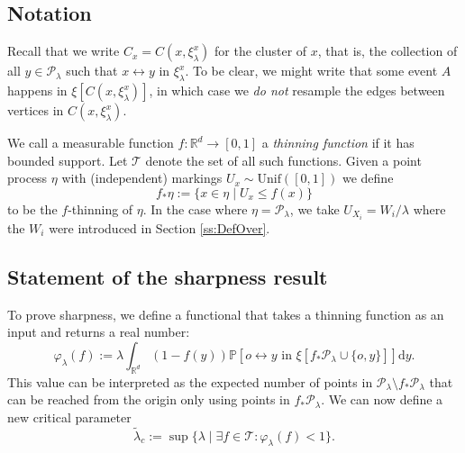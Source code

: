 \documentclass[a4paper,12pt]{scrartcl}
\renewcommand{\P}{\mathbb{P}}
\renewcommand{\d}{\mathrm{d}}
\newcommand{\reals}{\mathbb{R}}
\theoremstyle{definition}
\theoremstyle{remark}
\begin{document}
\subsection{Notation}

Recall that we write $C_x=C(x, \xi_\lambda^x)$ for the cluster of $x$, that is, the collection of all $y\in\mathcal P_\lambda$ such that $x\leftrightarrow y$ in $\xi_\lambda^x$. To be clear, we might write that some event $A$ happens in $\xi[C(x,\xi_\lambda^x)]$, in which case we \emph{do not} resample the edges between vertices in $C(x,\xi_\lambda^x)$.

We call a measurable function $f:\reals^d\to[0,1]$ a \emph{thinning function} if it has bounded support. Let $\mathcal T$ denote the set of all such functions. Given a point process $\eta$ with (independent) markings $U_x\sim \text{Unif}([0,1])$ we define
\begin{equation}
  f_*\eta := \{x\in\eta\mid U_x\leq f(x)\}
\end{equation}
to be the $f$-thinning of $\eta$.
In the case where $\eta = \mathcal P_\lambda$, we take $U_{X_i}
= W_{i}/\lambda$ where the $W_i$ were introduced in Section \ref{ss:DefOver}.


\subsection{Statement of the sharpness result}
To prove sharpness, we define a functional that takes a thinning function as an input and returns a real number:
\begin{equation}\label{e:defphi}
  \varphi_\lambda(f) :=
  \lambda\int_{\reals^d}
  (1-f(y))
  \P[o\leftrightarrow y
    \text{ in }
  \xi[f_*\mathcal P_\lambda\cup\{o,y\}]]
  \d y.
\end{equation}
This value can be interpreted as the expected number of points in $\mathcal P_\lambda\setminus f_*\mathcal P_\lambda$ that can be reached from the origin only using points in $f_*\mathcal P_\lambda$.
We can now define a new critical parameter
\begin{equation}
  \label{e:tlacdef}
  \tilde\lambda_c:=
  \sup\{\lambda\mid\exists f\in\mathcal T:\varphi_\lambda(f)<1\}.
\end{equation}
\end{document}
